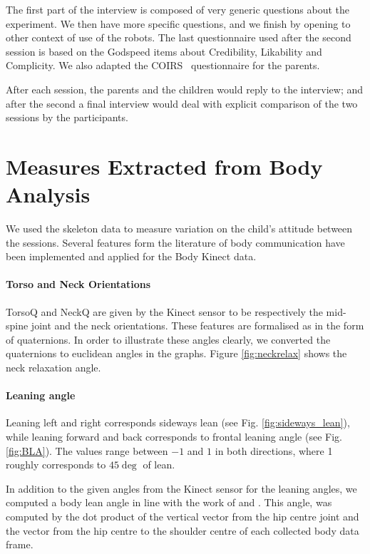 \documentclass[smallextended]{svjour3}
\begin{document}
The first part of the interview is composed of very generic questions about the experiment. 
We then have more specific questions, and we finish by opening to other context of use of the robots.
The last questionnaire used after the second session is based on the Godspeed\cite{Bartneck2008b} items about Credibility, Likability and Complicity. 
We also adapted the COIRS~\cite{Robert2014} questionnaire for the parents.


After each session, the parents and the children would reply to the interview; and after the second a final interview would deal with explicit comparison of the two sessions by the participants.
\newpage
\section{Measures Extracted from Body Analysis}
We used the skeleton data to measure variation on the child's attitude between the sessions.
Several features form the literature of body communication have been implemented and applied for the Body Kinect data.


\paragraph{Torso and Neck Orientations}
TorsoQ and NeckQ are given by the Kinect sensor to be respectively the mid-spine joint and the neck orientations. 
These features are formalised as in the form of quaternions. 
In order to illustrate  these angles clearly, we converted the quaternions to euclidean angles in the graphs.
Figure \ref{fig:neckrelax} shows the neck relaxation angle.

\paragraph{Leaning angle}
Leaning left and right corresponds sideways lean (see Fig. \ref{fig:sideways_lean}), while leaning forward and back corresponds to frontal leaning angle (see Fig. \ref{fig:BLA}). 
The values range between $-1$ and $1$ in both directions, where 1 roughly corresponds to $45\deg$ of lean.

In addition to the given angles from the Kinect sensor for the leaning angles, we computed a body lean angle in line with the work of \cite{Castellano} and \cite{Schegloff}. This angle, was computed by the dot product of the vertical vector from the hip centre joint and the vector from the hip centre to the shoulder centre of each collected body data frame. 
\end{document}
